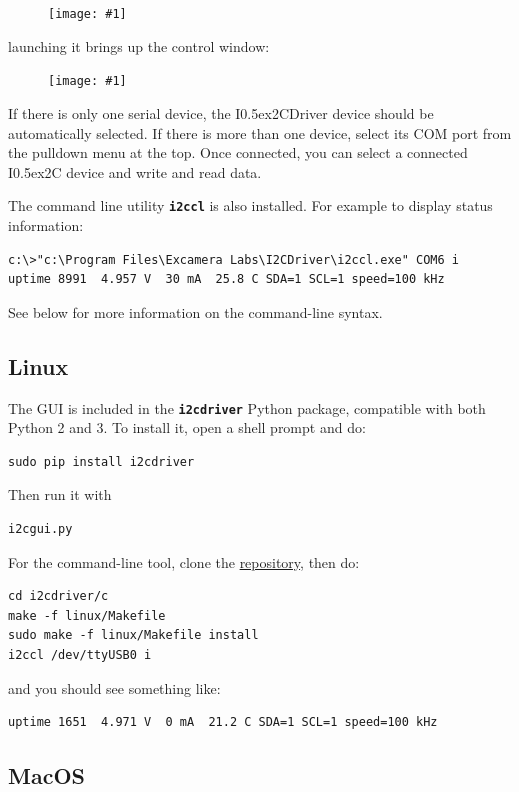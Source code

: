 \documentclass{article}
\newcommand{\two}{\raise0.5ex\hbox{\footnotesize{2}}}
\newcommand{\iic}{I\two{}C}
\newcommand{\iicdriver}{I\two{}CDriver}
\newcommand{\pngw}[2]{
\begin{figure}[H]
\begin{center}
\texttt{[image: \#1]}
\end{center}
\end{figure}
}
\newcommand{\mach}[1]{\texttt{\textbf{#1}}}
\begin{document}
\pngw{img/i2cdriver/win32-icon}{.3}

launching it brings up the control window:

\pngw{img/i2cdriver/win32-gui}{1.0}

If there is only one serial device, 
the \iicdriver{} device should be automatically selected.
If there is more than one device, select its COM port from the pulldown menu at the top.
Once connected, you can select a connected \iic{} device and write and read data. 

The command line utility \mach{i2ccl} is also installed. For example to display status information:

\begin{lstlisting}
c:\>"c:\Program Files\Excamera Labs\I2CDriver\i2ccl.exe" COM6 i
uptime 8991  4.957 V  30 mA  25.8 C SDA=1 SCL=1 speed=100 kHz
\end{lstlisting}

See below for more information on the command-line syntax.

\subsection{Linux}

The GUI is included in the \mach{i2cdriver} Python package, compatible with both Python 2 and 3.
To install it, open a shell prompt and do:

\begin{lstlisting}
sudo pip install i2cdriver
\end{lstlisting}

Then run it with

\begin{lstlisting}
i2cgui.py
\end{lstlisting}

For the command-line tool, clone the
\href{https://github.com/jamesbowman/i2cdriver}{repository},
then do:

\begin{lstlisting}
cd i2cdriver/c
make -f linux/Makefile
sudo make -f linux/Makefile install
i2ccl /dev/ttyUSB0 i
\end{lstlisting}

and you should see something like:

\begin{lstlisting}
uptime 1651  4.971 V  0 mA  21.2 C SDA=1 SCL=1 speed=100 kHz
\end{lstlisting}

\subsection{MacOS}
\end{document}
